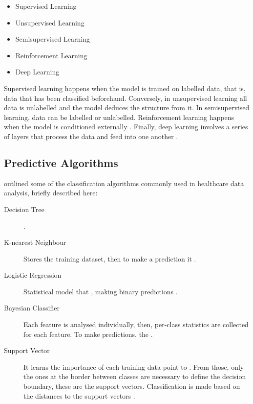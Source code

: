 \documentclass[a4paper,12pt]{article}
\begin{document}
\begin{itemize}
 \item Supervised Learning
 \item Unsupervised Learning
 \item Semisupervised Learning
 \item Reinforcement Learning
 \item Deep Learning
\end{itemize}

Supervised learning happens when the model is trained on labelled data, that is, data that has been classified beforehand.
Conversely, in unsupervised learning all data is unlabelled and the model deduces the structure from it. In semisupervised learning, data can be labelled or unlabelled.
Reinforcement learning happens when the model is conditioned externally \parencite[11]{Ibrahim2021}.
Finally, deep learning involves a series of layers that process the data and feed into one another \parencite[13]{Ibrahim2021}.

\subsection{Predictive Algorithms}


\textcite{Jothi2015} outlined some of the classification algorithms commonly used in healthcare data analysis, briefly described here:

\begin{description}
    \item[Decision Tree] .
    \item[K-nearest Neighbour] Stores the training dataset, then to make a prediction it .
    \item[Logistic Regression] Statistical model that , making binary predictions \parencite{Nick2007}.
    \item[Bayesian Classifier] Each feature is analysed individually, then, per-class statistics are collected for each feature. 
    To make predictions, the .
    \item[Support Vector] It learns the importance of each training data point to .
    From those, only the ones at the border between classes are necessary to define the decision boundary, these are the support vectors.
    Classification is made based on the distances to the support vectors \parencite[98]{Mueller2017}.
\end{description}
\end{document}
